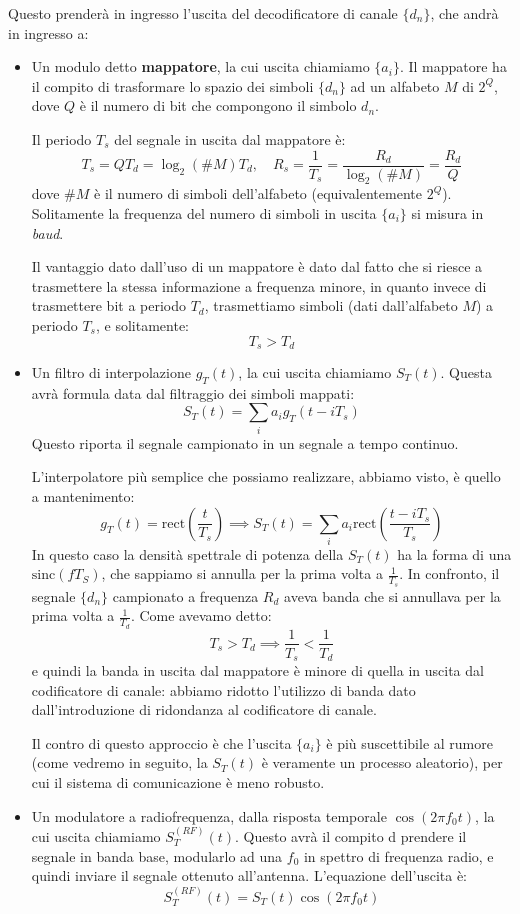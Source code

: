 \documentclass[a4paper,11pt]{article}
\begin{document}
Questo prenderà in ingresso l'uscita del decodificatore di canale $\{d_n\}$, che andrà in ingresso a:
\begin{itemize}
\item Un modulo detto \textbf{mappatore}, la cui uscita chiamiamo $\{a_i\}$. Il mappatore ha il compito di trasformare lo spazio dei simboli $\{d_n\}$ ad un alfabeto $M$ di $2^Q$, dove $Q$ è il numero di bit che compongono il simbolo $d_n$.

Il periodo $T_s$ del segnale in uscita dal mappatore è:
$$
T_s = Q T_d = \log_2 (\# M) T_d, \quad R_s = \frac{1}{T_s} = \frac{R_d}{\log_2(\# M)} = \frac{R_d}{Q}
$$
dove $\# M$ è il numero di simboli dell'alfabeto (equivalentemente $2^Q$). Solitamente la frequenza del numero di simboli in uscita $\{a_i\}$ si misura in \textit{baud}. 

Il vantaggio dato dall'uso di un mappatore è dato dal fatto che si riesce a trasmettere la stessa informazione a frequenza minore, in quanto invece di trasmettere bit a periodo $T_d$, trasmettiamo simboli (dati dall'alfabeto $M$) a periodo $T_s$, e solitamente:
$$
T_s > T_d
$$

\item Un filtro di interpolazione $g_T(t)$, la cui uscita chiamiamo $S_T(t)$. Questa avrà formula data dal filtraggio dei simboli mappati:
$$
S_T(t) = \sum_i a_i g_T (t - i T_s)
$$
Questo riporta il segnale campionato in un segnale a tempo continuo.

L'interpolatore più semplice che possiamo realizzare, abbiamo visto, è quello a mantenimento:
$$
g_T(t) = \mathrm{rect} \left( \frac{t}{T_s} \right) \implies S_T(t) = \sum_i a_i \mathrm{rect} \left( \frac{t - i T_s}{T_s} \right)
$$
In questo caso la densità spettrale di potenza della $S_T(t)$ ha la forma di una $\mathrm{sinc}(f T_S)$, che sappiamo si annulla per la prima volta a $\frac{1}{T_s}$. In confronto, il segnale $\{d_n\}$ campionato a frequenza $R_d$ aveva banda che si annullava per la prima volta a $\frac{1}{T_d}$. Come avevamo detto:
$$
T_s > T_d \implies \frac{1}{T_s} < \frac{1}{T_d}
$$
e quindi la banda in uscita dal mappatore è minore di quella in uscita dal codificatore di canale: abbiamo ridotto l'utilizzo di banda dato dall'introduzione di ridondanza al codificatore di canale.

Il contro di questo approccio è che l'uscita $\{a_i\}$ è più suscettibile al rumore (come vedremo in seguito, la $S_T(t)$ è veramente un processo aleatorio), per cui il sistema di comunicazione è meno robusto. 

\item Un modulatore a radiofrequenza, dalla risposta temporale $\cos(2 \pi f_0 t)$, la cui uscita chiamiamo $S_T^{(RF)}(t)$. Questo avrà il compito d prendere il segnale in banda base, modularlo ad una $f_0$ in spettro di frequenza radio, e quindi inviare il segnale ottenuto all'antenna. L'equazione dell'uscita è:
$$
S_T^{(RF)}(t) = S_T(t) \cos (2 \pi f_0 t)
$$
\end{itemize}
\end{document}
